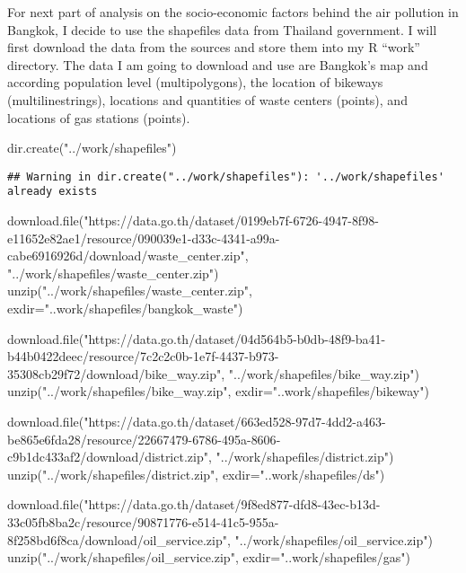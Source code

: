 \documentclass[
]{article}
\newenvironment{Shaded}{\begin{snugshade}}{\end{snugshade}}
\newcommand{\AttributeTok}[1]{\textcolor[rgb]{0.77,0.63,0.00}{#1}}
\newcommand{\FunctionTok}[1]{\textcolor[rgb]{0.00,0.00,0.00}{#1}}
\newcommand{\NormalTok}[1]{#1}
\newcommand{\StringTok}[1]{\textcolor[rgb]{0.31,0.60,0.02}{#1}}
\begin{document}
For next part of analysis on the socio-economic factors behind the air
pollution in Bangkok, I decide to use the shapefiles data from Thailand
government. I will first download the data from the sources and store
them into my R ``work'' directory. The data I am going to download and
use are Bangkok's map and according population level (multipolygons),
the location of bikeways (multilinestrings), locations and quantities of
waste centers (points), and locations of gas stations (points).

\begin{Shaded}
\begin{Highlighting}[]
\FunctionTok{dir.create}\NormalTok{(}\StringTok{"../work/shapefiles"}\NormalTok{)}
\end{Highlighting}
\end{Shaded}

\begin{verbatim}
## Warning in dir.create("../work/shapefiles"): '../work/shapefiles' already exists
\end{verbatim}

\begin{Shaded}
\begin{Highlighting}[]
\FunctionTok{download.file}\NormalTok{(}\StringTok{"https://data.go.th/dataset/0199eb7f{-}6726{-}4947{-}8f98{-}e11652e82ae1/resource/090039e1{-}d33c{-}4341{-}a99a{-}cabe6916926d/download/waste\_center.zip"}\NormalTok{,}
              \StringTok{"../work/shapefiles/waste\_center.zip"}\NormalTok{)}
\FunctionTok{unzip}\NormalTok{(}\StringTok{"../work/shapefiles/waste\_center.zip"}\NormalTok{,}
      \AttributeTok{exdir=}\StringTok{"..work/shapefiles/bangkok\_waste"}\NormalTok{)}

\FunctionTok{download.file}\NormalTok{(}\StringTok{"https://data.go.th/dataset/04d564b5{-}b0db{-}48f9{-}ba41{-}b44b0422deec/resource/7c2c2c0b{-}1e7f{-}4437{-}b973{-}35308cb29f72/download/bike\_way.zip"}\NormalTok{,}
              \StringTok{"../work/shapefiles/bike\_way.zip"}\NormalTok{)}
\FunctionTok{unzip}\NormalTok{(}\StringTok{"../work/shapefiles/bike\_way.zip"}\NormalTok{,}
      \AttributeTok{exdir=}\StringTok{"..work/shapefiles/bikeway"}\NormalTok{)}

\FunctionTok{download.file}\NormalTok{(}\StringTok{"https://data.go.th/dataset/663ed528{-}97d7{-}4dd2{-}a463{-}be865e6fda28/resource/22667479{-}6786{-}495a{-}8606{-}c9b1dc433af2/download/district.zip"}\NormalTok{,}
              \StringTok{"../work/shapefiles/district.zip"}\NormalTok{)}
\FunctionTok{unzip}\NormalTok{(}\StringTok{"../work/shapefiles/district.zip"}\NormalTok{,}
      \AttributeTok{exdir=}\StringTok{"..work/shapefiles/ds"}\NormalTok{)}

\FunctionTok{download.file}\NormalTok{(}\StringTok{"https://data.go.th/dataset/9f8ed877{-}dfd8{-}43ec{-}b13d{-}33c05fb8ba2c/resource/90871776{-}e514{-}41c5{-}955a{-}8f258bd6f8ca/download/oil\_service.zip"}\NormalTok{,}
              \StringTok{"../work/shapefiles/oil\_service.zip"}\NormalTok{)}
\FunctionTok{unzip}\NormalTok{(}\StringTok{"../work/shapefiles/oil\_service.zip"}\NormalTok{,}
      \AttributeTok{exdir=}\StringTok{"..work/shapefiles/gas"}\NormalTok{)}
\end{Highlighting}
\end{Shaded}
\end{document}
